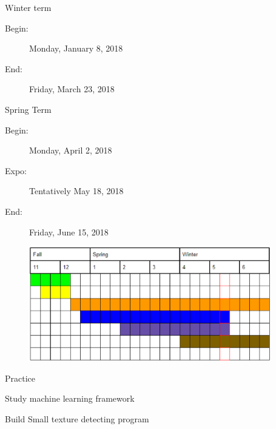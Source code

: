 \documentclass[onecolumn, draftclsnofoot,10pt, compsoc]{IEEEtran}
\begin{document}
Winter term
\begin{description}
	\item[Begin:]Monday, January 8, 2018
	\item[End:]	 Friday, March 23, 2018
\end{description}


Spring Term
\begin{description}
	\item[Begin:]Monday, April 2, 2018
	\item[Expo:] 	Tentatively May 18, 2018
	\item[End:]			Friday, June 15, 2018
\end{description}


\begin{figure}[h]
\includegraphics[height= 5cm]{Gantt}
\centering
\end{figure}

Practice
\begin{description}
	\color{green}
	\item[--]Study machine learning framework
	\color{yellow}
	\item[--]Build Small texture detecting program
\end{description}
\end{document}
